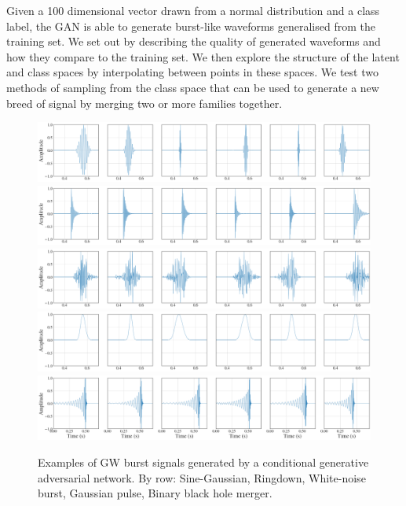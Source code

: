 \documentclass[12pt]{iopart}
\begin{document}
Given a 100 dimensional vector drawn from a normal distribution and a class label, the GAN is able to generate burst-like waveforms  generalised from the training set. We set out by describing the quality of generated waveforms and how they compare to the training set. We then explore the structure of the latent and class spaces by interpolating between points in these spaces. We test  two methods of sampling from the class space that can be used to generate a new breed of signal by merging two or more families together.


\begin{figure}
    \centering
    \includegraphics[width=\textwidth]{figures/generations/sg.png}
    \includegraphics[width=\textwidth]{figures/generations/rd.png}
    \includegraphics[width=\textwidth]{figures/generations/wnb.png}
    \includegraphics[width=\textwidth]{figures/generations/blip.png}
    \includegraphics[width=\textwidth]{figures/generations/bbh.png}
    \caption{Examples of \ac{GW} burst signals generated by a conditional generative adversarial network. By row: Sine-Gaussian, Ringdown,
White-noise burst, Gaussian pulse, Binary black hole merger.}
\label{fig:gen_signals} \end{figure}
\end{document}

